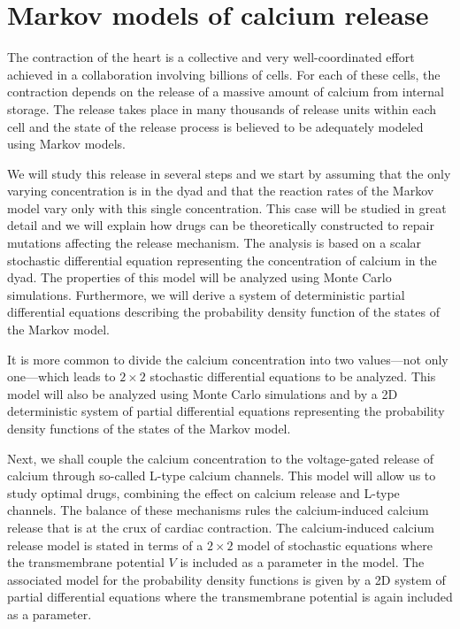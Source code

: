 \section{Markov models of calcium release}
The contraction of the heart is a collective and very well-coordinated effort achieved in a collaboration involving billions of cells. For each of these cells, the contraction depends on the release of a massive amount of calcium from internal storage. The release takes place in many thousands of release units within each cell and the state of the release process is believed to be adequately modeled using Markov models. 

We will study this release in several steps and we start by assuming that the only varying concentration is in the dyad and that the reaction rates of the Markov model vary only with this single concentration. This case will be studied in great detail and we will explain how drugs can be theoretically constructed to repair mutations affecting the release mechanism. The analysis is based on a scalar stochastic differential equation representing the concentration of calcium in the dyad. The properties of this model will be analyzed using Monte Carlo simulations. Furthermore, we will derive a system of deterministic partial differential equations describing the probability density function of the states of the Markov model. 

It is more common to divide the calcium concentration into two values---not only one---which leads to  $2\times2$ stochastic differential equations to be analyzed. This model will also be analyzed using Monte Carlo simulations and by a 2D deterministic system of partial differential equations representing the probability density functions of the states of the Markov model.

Next, we shall couple the calcium concentration to the voltage-gated release of calcium through so-called L-type calcium channels. This model will allow us to study optimal drugs, combining the effect on calcium release and L-type channels. The balance of these mechanisms rules the calcium-induced calcium release that is at the crux of cardiac contraction. The calcium-induced calcium release model is stated in terms of a $2\times 2$ model of stochastic equations where the transmembrane potential $V$ is included as a parameter in the model. The associated model for the probability density functions is given by a 2D system of partial differential equations where the transmembrane potential is again included as a parameter.
 
